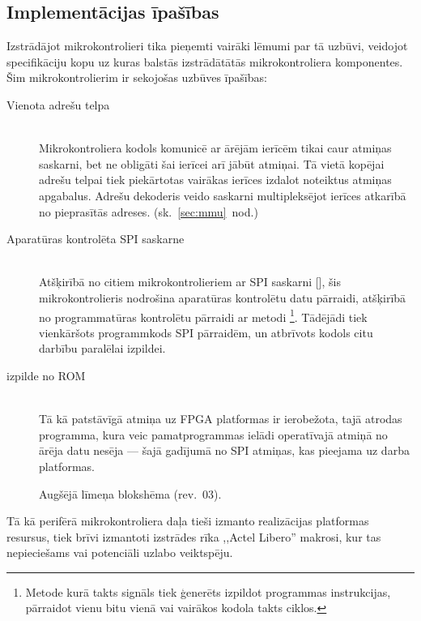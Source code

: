 \subsection{Implementācijas īpašības} \label{sec:design}
Izstrādājot mikrokontrolieri tika pieņemti vairāki lēmumi par tā uzbūvi,
veidojot specifikāciju kopu uz kuras
balstās izstrādātātās mikrokontroliera komponentes.
Šim mikrokontrolierim ir sekojošas uzbūves īpašības:
\begin{description}
	\item[Vienota adrešu telpa] \hfill \\
		Mikrokontroliera kodols komunicē ar ārējām ierīcēm tikai caur
		atmiņas saskarni, bet ne obligāti šai ierīcei arī jābūt atmiņai.
		Tā vietā kopējai adrešu telpai tiek piekārtotas vairākas ierīces
		izdalot noteiktus atmiņas apgabalus. Adrešu dekoderis veido saskarni
		multipleksējot ierīces atkarībā no pieprasītās adreses.
		(sk.~\ref{sec:mmu}~nod.)\pagebreak[1]
	\item[Aparatūras kontrolēta SPI saskarne] \hfill \\
		Atšķirībā no citiem mikrokontrolieriem ar SPI saskarni
		[\todo ], %
		šis mikro\-kontrolieris nodrošina aparatūras kontrolētu datu pārraidi,
		atšķirībā no programmatūras kontrolētu pārraidi ar
		 metodi%
		\footnote{Metode kurā takts signāls tiek ģenerēts izpildot programmas
			instrukcijas, pārraidot vienu bitu vienā vai vairākos kodola takts ciklos.}.
		Tādējādi tiek vienkāršots programmkods SPI pārraidēm, un atbrīvots
		kodols citu darbību paralēlai izpildei.
	\item[ izpilde no ROM] \hfill \\
		Tā kā patstāvīgā atmiņa uz FPGA platformas ir ierobežota, tajā
		atrodas  programma, kura veic pamatprogrammas ielādi
		operatīvajā atmiņā no ārēja datu nesēja --- šajā gadījumā no 
		SPI  atmiņas, kas pieejama uz darba platformas.
	\item[] \todo
\end{description}

\begin{figure}[tbhp]
	\centering
	\def\svgwidth{\textwidth}
	{}
	\caption{Augšējā līmeņa blokshēma (rev.~03).}
	\label{fig:top-rev3}
\end{figure}

Tā kā perifērā mikrokontroliera daļa tieši izmanto realizācijas
platformas resursus, tiek brīvi izmantoti izstrādes rīka 
,,Actel Libero'' makrosi, kur tas nepieciešams vai potenciāli uzlabo
veiktspēju.
\FloatBarrier %
